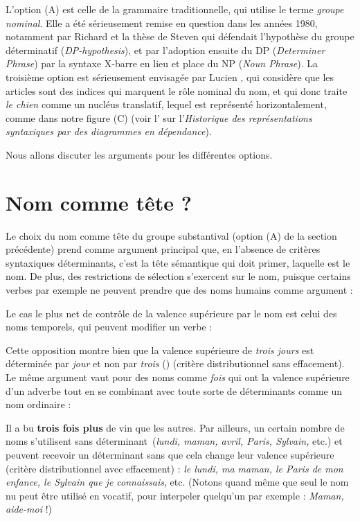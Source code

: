 L’option (A) est celle de la grammaire traditionnelle, qui utilise le terme \textit{groupe nominal}. Elle a été sérieusement remise en question dans les années 1980, notamment par Richard \citet{hudson1984word} et la thèse de Steven \citet{abney1987english} qui défendait l’hypothèse du groupe déterminatif (\textit{DP-hypothesis}), et par l’adoption ensuite du DP (\textit{Determiner Phrase}) par la syntaxe X-barre en lieu et place du NP (\textit{Noun Phrase}). La troisième option est sérieusement envisagée par Lucien \citet{tesniere1959elements}, qui considère que les articles sont des indices qui marquent le rôle nominal du nom, et qui donc traite \textit{le chien} comme un nucléus translatif, lequel est représenté horizontalement, comme dans notre figure (C) (voir l’ sur l’\textit{Historique des représentations syntaxiques par des diagrammes en dépendance}).

Nous allons discuter les arguments pour les différentes options.

\section{Nom comme tête ?}\label{sec:3.3.24}

Le choix du nom comme tête du groupe substantival (option (A) de la section précédente) prend comme argument principal que, en l’absence de critères syntaxiques déterminants, c’est la tête sémantique qui doit primer, laquelle est le nom. De plus, des restrictions de sélection s’exercent sur le nom, puisque certains verbes par exemple ne peuvent prendre que des noms humains comme argument :

\ea
{}
\z
\z
Le cas le plus net de contrôle de la valence supérieure par le nom est celui des noms temporels, qui peuvent modifier un verbe :

\ea
  \z
\z
Cette opposition montre bien que la valence supérieure de \textit{trois jours} est déterminée par \textit{jour} et non par \textit{trois} (\citealt{langendonck1994determiners}) (critère distributionnel sans effacement). Le même argument vaut pour des noms comme \textit{fois} qui ont la valence supérieure d’un adverbe tout en se combinant avec toute sorte de déterminants comme un nom ordinaire :

\ea
    {Il a bu} \textbf{{trois fois plus}} {de vin que les autres}.
\z
Par ailleurs, un certain nombre de noms s’utilisent sans déterminant~(\textit{lundi, maman, avril, Paris, Sylvain,} etc.) et peuvent recevoir un déterminant sans que cela change leur valence supérieure~ (critère distributionnel avec effacement) : \textit{le lundi, ma maman, le Paris de mon enfance, le Sylvain que je connaissais}, etc. (Notons quand même que seul le nom nu peut être utilisé en vocatif, pour interpeler quelqu’un par exemple : \textit{Maman, aide-moi} !)

